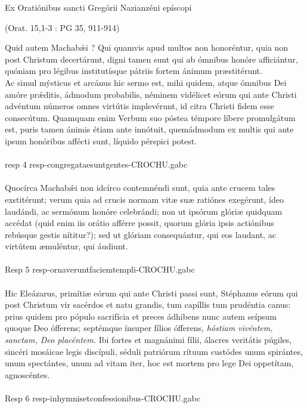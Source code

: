 \documentclass[options]{article}
\begin{document}
	Ex Oratiónibus sancti Gregórii Nazianzéni epíscopi
	\begin{flushright}
		(Orat. 15,1-3 : PG 35, 911-914)
	\end{flushright}
Quid autem Machab\'{æ}i ? Qui quamvis apud multos non honoréntur, quia non post Christum decertárunt, digni tamen sunt qui ab ómnibus honóre afficiántur, quóniam pro légibus institutísque pátriis fortem ánimum præstitérunt.\\ 
Ac simul mýsticus et arcánus hic sermo est, mihi quidem, atque ómnibus Dei amóre pr\'{æ}ditis, ádmodum probabilis, néminem vidélicet eórum qui ante Christi advéntum números omnes virtútis implevérunt, id citra Christi fidem esse consecútum. Quamquam enim Verbum suo póstea témpore líbere promulgátum est, puris tamen ánimis étiam ante innótuit, quemádmodum ex multis qui ante ipsum honóribus affécti sunt, líquido pérspici potest.\\
\\
resp 4  resp-congregataesuntgentes-CROCHU.gabc\\
\\
Quocírca Machab\'{æ}i non idcírco contemnéndi sunt, quia ante crucem tales exstitérunt; verum quia ad crucis normam vitæ suæ ratiónes exegérunt, ídeo laudándi, ac sermónum honóre celebrándi; non ut ipsórum glóriæ quidquam accédat (quid enim iis orátio afférre possit, quorum glória ipsis actiónibus rebúsque gestis nítitur?); sed ut glóriam consequántur, qui eos laudant, ac virtútem æmuléntur, qui áudiunt.\\
\\
Resp 5 resp-ornaveruntfaciemtempli-CROCHU.gabc\\
\\
Hic Eleázarus, primítiæ eórum qui ante Christi passi sunt, Stéphanus eórum qui post Christum vir sacérdos et natu grandis, tum capíllis tum prudéntia canus: prius quidem pro pópulo sacrifícia et preces ádhibens nunc autem seípsum quoque Deo ófferens; septémque ínsuper fílios ófferens,
\emph{ hóstiam vivéntem, sanctam, Deo placéntem.}
Ibi fortes et magnánimi fílii, álacres veritátis púgiles, sincéri mosáicae legis discípuli, séduli patriórum rítuum custódes unum spirántes, unum spectántes, unum ad vitam iter, hoc est mortem pro lege Dei oppetítam, agnoscéntes.\\
\\
Resp 6 resp-inhymnisetconfessionibus-CROCHU.gabc\\
\\
\end{document}
